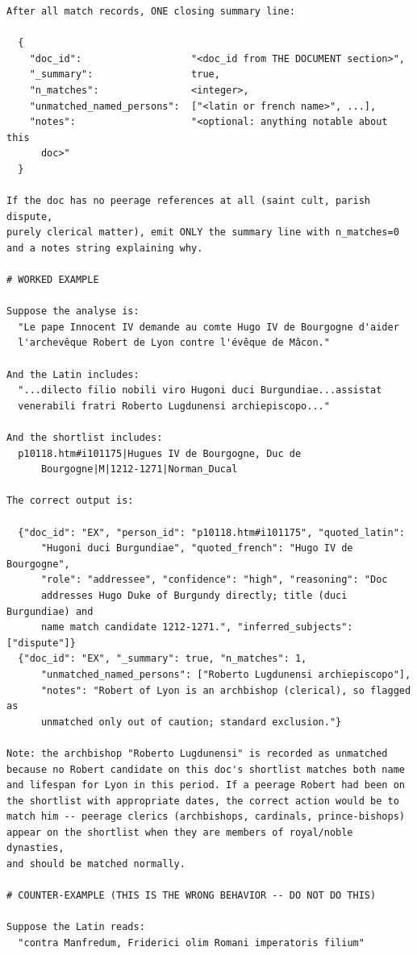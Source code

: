 \documentclass[12pt]{article}
\theoremstyle{definition}
\theoremstyle{remark}
\begin{document}
{\begin{verbatim}
After all match records, ONE closing summary line:

  {
    "doc_id":                   "<doc_id from THE DOCUMENT section>",
    "_summary":                 true,
    "n_matches":                <integer>,
    "unmatched_named_persons":  ["<latin or french name>", ...],
    "notes":                    "<optional: anything notable about this
      doc>"
  }

If the doc has no peerage references at all (saint cult, parish dispute,
purely clerical matter), emit ONLY the summary line with n_matches=0
and a notes string explaining why.

# WORKED EXAMPLE

Suppose the analyse is:
  "Le pape Innocent IV demande au comte Hugo IV de Bourgogne d'aider
  l'archevêque Robert de Lyon contre l'évêque de Mâcon."

And the Latin includes:
  "...dilecto filio nobili viro Hugoni duci Burgundiae...assistat
  venerabili fratri Roberto Lugdunensi archiepiscopo..."

And the shortlist includes:
  p10118.htm#i101175|Hugues IV de Bourgogne, Duc de
      Bourgogne|M|1212-1271|Norman_Ducal

The correct output is:

  {"doc_id": "EX", "person_id": "p10118.htm#i101175", "quoted_latin":
      "Hugoni duci Burgundiae", "quoted_french": "Hugo IV de Bourgogne",
      "role": "addressee", "confidence": "high", "reasoning": "Doc
      addresses Hugo Duke of Burgundy directly; title (duci Burgundiae) and
      name match candidate 1212-1271.", "inferred_subjects": ["dispute"]}
  {"doc_id": "EX", "_summary": true, "n_matches": 1,
      "unmatched_named_persons": ["Roberto Lugdunensi archiepiscopo"],
      "notes": "Robert of Lyon is an archbishop (clerical), so flagged as
      unmatched only out of caution; standard exclusion."}

Note: the archbishop "Roberto Lugdunensi" is recorded as unmatched
because no Robert candidate on this doc's shortlist matches both name
and lifespan for Lyon in this period. If a peerage Robert had been on
the shortlist with appropriate dates, the correct action would be to
match him -- peerage clerics (archbishops, cardinals, prince-bishops)
appear on the shortlist when they are members of royal/noble dynasties,
and should be matched normally.

# COUNTER-EXAMPLE (THIS IS THE WRONG BEHAVIOR -- DO NOT DO THIS)

Suppose the Latin reads:
  "contra Manfredum, Friderici olim Romani imperatoris filium"


\end{verbatim}}
\end{document}
